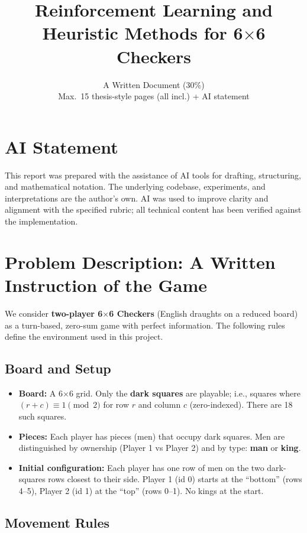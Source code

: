 \documentclass[11pt,a4paper]{article}
\title{Reinforcement Learning and Heuristic Methods for 6$\times$6 Checkers}
\author{A Written Document (30\%)\\Max.\ 15 thesis-style pages (all incl.) + AI statement}
\date{}
\begin{document}
\maketitle

\section*{AI Statement}

This report was prepared with the assistance of AI tools for drafting, structuring, and mathematical notation. The underlying codebase, experiments, and interpretations are the author's own. AI was used to improve clarity and alignment with the specified rubric; all technical content has been verified against the implementation.

\hrulefill

\section{Problem Description: A Written Instruction of the Game}

We consider \textbf{two-player 6$\times$6 Checkers} (English draughts on a reduced board) as a turn-based, zero-sum game with perfect information. The following rules define the environment used in this project.

\subsection{Board and Setup}

\begin{itemize}[noitemsep]
  \item \textbf{Board:} A 6$\times$6 grid. Only the \textbf{dark squares} are playable; i.e., squares where $(r + c) \equiv 1 \pmod{2}$ for row $r$ and column $c$ (zero-indexed). There are 18 such squares.
  \item \textbf{Pieces:} Each player has pieces (men) that occupy dark squares. Men are distinguished by ownership (Player 1 vs Player 2) and by type: \textbf{man} or \textbf{king}.
  \item \textbf{Initial configuration:} Each player has one row of men on the two dark-squares rows closest to their side. Player 1 (id 0) starts at the ``bottom'' (rows 4--5), Player 2 (id 1) at the ``top'' (rows 0--1). No kings at the start.
\end{itemize}

\subsection{Movement Rules}
\end{document}
